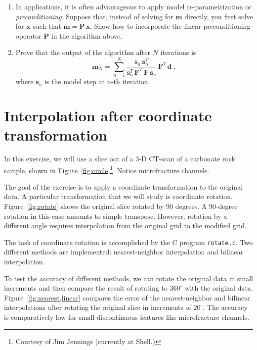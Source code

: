 \begin{enumerate}
\begin{enumerate}
\item  In applications, it is often advantageous to apply model
    re-parametrization or \emph{preconditioning}. Suppose that,
  instead of solving for $\mathbf{m}$ directly, you first solve for
  $\mathbf{x}$ such that $\mathbf{m} = \mathbf{P}\,\mathbf{x}$. Show
  how to incorporate the linear preconditioning operator $\mathbf{P}$
  in the algorithm above.
\item Prove that the output of the algorithm after $N$ iterations is
\begin{equation}
\label{eq:msol}
\mathbf{m}_N = \sum\limits_{n=1}^{N} \frac{\mathbf{s}_n\,\mathbf{s}_n^T}{\mathbf{s}_n^T\,\mathbf{F}^T\,\mathbf{F}\,\mathbf{s}_n}\,\mathbf{F}^T\,\mathbf{d}\;,
\end{equation}
where $\mathbf{s}_n$ is the model step at $n$-th iteration.

\end{enumerate}

\end{enumerate}

\section{Interpolation after coordinate transformation}

In this exercise, we will use a slice out of a 3-D CT-scan of a
carbonate rock sample, shown in
Figure~\ref{fig:circle}\footnote{Courtesy of Jim Jennings
  (currently at Shell.)}. Notice microfracture channels.


The goal of the exercise is to apply a coordinate transformation to
the original data. A particular transformation that we will study is
coordinate rotation. Figure~\ref{fig:rotate} shows the original slice
rotated by 90 degrees. A 90-degree rotation in this case amounts to
simple transpose. However, rotation by a different angle requires
interpolation from the original grid to the modified grid.

The task of coordinate rotation is accomplished by the C program
\texttt{rotate.c}. Two different methods are implemented: 
nearest-neighbor interpolation and bilinear interpolation.

To test the accuracy of different methods, we can rotate the original
data in small increments and then compare the result of rotating to
$360^{\circ}$ with the original data. Figure~\ref{fig:nearest,linear}
compares the error of the nearest-neighbor and bilinear interpolations
after rotating the original slice in increments of $20^{\circ}$. The
accuracy is comparatively low for small discontinuous features like
microfracture channels.

